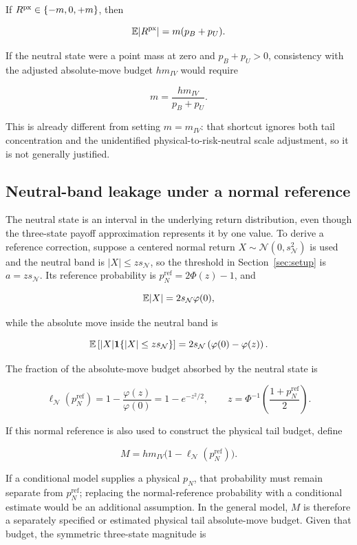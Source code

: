 If $R^{\mathrm{px}}\in\{-m,0,+m\}$, then

\[
\mathbb{E}|R^{\mathrm{px}}|=m(p_B+p_U).
\]

If the neutral state were a point mass at zero and $p_B+p_U>0$, consistency
with the adjusted absolute-move budget $h m_{IV}$ would require

\[
m=\frac{h m_{IV}}{p_B+p_U}.
\]

This is already different from setting $m=m_{IV}$: that shortcut ignores both
tail concentration and the unidentified physical-to-risk-neutral scale
adjustment, so it is not generally justified.

\subsection{Neutral-band leakage under a normal reference}
\label{sec:leak}

The neutral state is an interval in the underlying return distribution, even
though the three-state payoff approximation represents it by one value. To
derive a reference correction, suppose a centered normal return
$X\sim\mathcal N(0,s_{\mathcal N}^2)$ is used and the neutral band is
$|X|\le z s_{\mathcal N}$, so the threshold in Section~\ref{sec:setup} is
$a=z s_{\mathcal N}$. Its reference probability is
$p_N^{\mathrm{ref}}=2\Phi(z)-1$, and

\[
\mathbb{E}|X|=2s_{\mathcal N}\varphi(0),
\]

while the absolute move inside the neutral band is

\[
\mathbb{E}\left[|X|\mathbf 1\{|X|\le z s_{\mathcal N}\}\right]
=2s_{\mathcal N}\left(\varphi(0)-\varphi(z)\right).
\]

The fraction of the absolute-move budget absorbed by the neutral state is

\[
\boxed{
\ell_{\mathcal N}(p_N^{\mathrm{ref}})=1-\frac{\varphi(z)}{\varphi(0)}
=1-e^{-z^2/2},
\qquad
z=\Phi^{-1}\left(\frac{1+p_N^{\mathrm{ref}}}{2}\right).
}
\]

If this normal reference is also used to construct the physical tail budget,
define

\[
\boxed{
M=h m_{IV}\bigl(1-\ell_{\mathcal N}(p_N^{\mathrm{ref}})\bigr).
}
\]

If a conditional model supplies a physical $p_N$, that probability must remain
separate from $p_N^{\mathrm{ref}}$; replacing the normal-reference probability
with a conditional estimate would be an additional assumption. In the general
model, $M$ is therefore a separately specified or estimated physical tail
absolute-move budget. Given that budget, the symmetric three-state magnitude is

